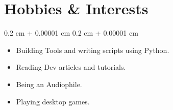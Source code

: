 \documentclass[10pt, letterpaper]{article}
\newenvironment{highlightsforbulletentries}{
    \begin{itemize}[
        topsep=0.10 cm,
        parsep=0.10 cm,
        partopsep=0pt,
        itemsep=0pt,
        leftmargin=10pt
    ]
}{
    \end{itemize}
} %
\newenvironment{onecolentry}{
    \begin{adjustwidth}{
        0.2 cm + 0.00001 cm
    }{
        0.2 cm + 0.00001 cm
    }
}{
    \end{adjustwidth}
} %
\begin{document}
    \section{Hobbies \& Interests}

    \begin{onecolentry}
        \begin{highlightsforbulletentries}


        \item Building Tools and writing scripts using Python.

        \item Reading Dev articles and tutorials.

        \item Being an Audiophile.

        \item Playing desktop games.


        \end{highlightsforbulletentries}
    \end{onecolentry}
\end{document}
